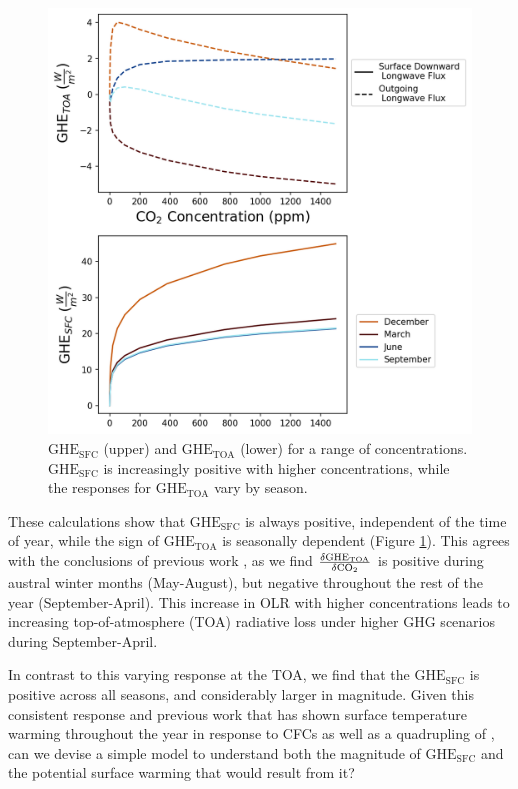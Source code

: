 \documentclass[draft]{agujournal2019}
\begin{document}
\begin{figure}[htb!]
\noindent\includegraphics[width=1\textwidth]{figures/GH_sfc_CO2_effect.png}
\centering
\caption{$\text{GHE}_{\text{SFC}}$ (upper) and $\text{GHE}_{\text{TOA}}$ (lower) for a range of  concentrations. $\text{GHE}_{\text{SFC}}$ is increasingly positive with higher  concentrations, while the responses for $\text{GHE}_{\text{TOA}}$ vary by season.}
\label{fig:sfc_toa_GHE}
\end{figure}

These calculations show that ${\text{GHE}_\text{{SFC}}}$ is always positive, independent of the time of year, while the sign of ${\text{GHE}_\text{{TOA}}}$ is seasonally dependent (Figure \ref{fig:sfc_toa_GHE}). This agrees with the conclusions of previous work  \cite{schmithusen_how_2015}, as we find $\frac{\delta{\text{GHE}_\text{{TOA}}}}{\delta\ce{CO_2}}$ is positive during austral winter months (May-August), but negative throughout the rest of the year (September-April). This increase in OLR with higher  concentrations leads to increasing top-of-atmosphere (TOA) radiative loss under higher GHG scenarios during September-April. 

In contrast to this varying response at the TOA, we find that the ${\text{GHE}_\text{{SFC}}}$ is positive across all seasons, and considerably larger in magnitude. Given this consistent response and previous work that has shown surface temperature warming throughout the year in response to CFCs \cite{flanner_climate_2018} as well as a quadrupling of  \cite{smith_no_2018}, can we devise a simple model to understand both the magnitude of ${\text{GHE}_\text{{SFC}}}$ and the potential surface warming that would result from it? 
\end{document}
